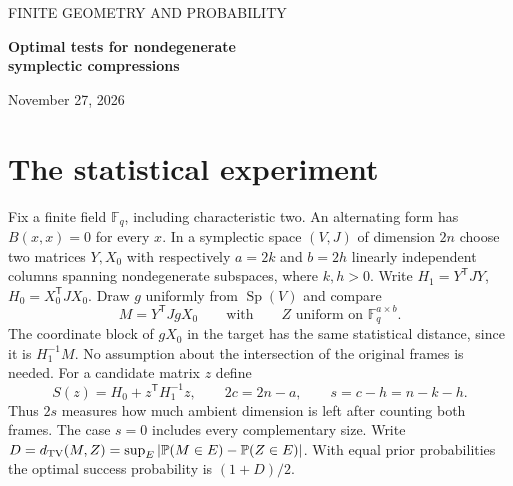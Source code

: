 \documentclass[11pt]{article}
\newcommand{\F}{\mathbb F_q}
\newcommand{\Sp}{\operatorname{Sp}}
\newcommand{\TV}{d_{\rm TV}}
\newcommand{\Prob}{\mathbb P}
\newcommand{\T}{\mathsf T}
\begin{document}
\begin{center}
{\large\color{ink}\sffamily FINITE GEOMETRY AND PROBABILITY}\par\vspace{8pt}
{\LARGE\bfseries Optimal tests for nondegenerate\\[3pt] symplectic compressions}\par\vspace{7pt}
{\small November 27, 2026}
\end{center}

\begin{abstract}
Given an observed rectangular block, how well can one distinguish a uniform symplectic transformation from a uniform matrix over the same finite field? For two nondegenerate frames of any dimensions, one threshold on the rank of a residual alternating form attains the exact total variation distance. Its meaning changes when the sum of the frame dimensions exceeds the ambient dimension. We compute the limiting distance for every integer offset from this boundary, with an error uniform in the offset and the aspect ratio. This includes complementary frames of fixed unequal dimension gap, an explicit open case in the ProveIt article. The proof uses a monotonicity property of alternating Gram counts and Fourier averaging over the orbit of a nonsingular form. All statements here are unconditional.
\end{abstract}

\section{The statistical experiment}
Fix a finite field $\F$, including characteristic two. An alternating form has $B(x,x)=0$ for every $x$. In a symplectic space $(V,J)$ of dimension $2n$ choose two matrices $Y,X_0$ with respectively $a=2k$ and $b=2h$ linearly independent columns spanning nondegenerate subspaces, where $k,h>0$. Write $H_1=Y^\T JY$, $H_0=X_0^\T JX_0$. Draw $g$ uniformly from $\Sp(V)$ and compare
\[
 M=Y^\T JgX_0\qquad\text{with}\qquad
 Z\text{ uniform on }\F^{a\times b}.
\]
The coordinate block of $gX_0$ in the target has the same statistical distance, since it is $H_1^{-1}M$. No assumption about the intersection of the original frames is needed. For a candidate matrix $z$ define
\[
 S(z)=H_0+z^\T H_1^{-1}z,\qquad 2c=2n-a,\qquad s=c-h=n-k-h .
\]
Thus $2s$ measures how much ambient dimension is left after counting both frames. The case $s=0$ includes every complementary size. Write $D=\TV(M,Z)=\sup_E|\Prob(M\in E)-\Prob(Z\in E)|$. With equal prior probabilities the optimal success probability is $(1+D)/2$.
\end{document}

